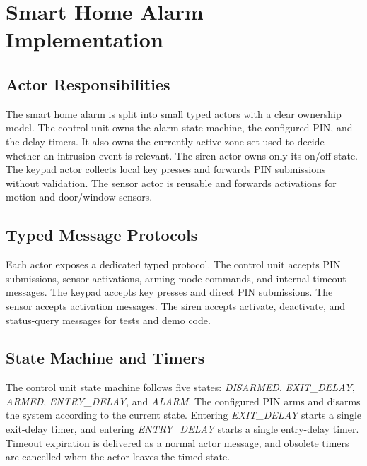 \section{Smart Home Alarm Implementation}

\subsection{Actor Responsibilities}
The smart home alarm is split into small typed actors with a clear ownership model.
The control unit owns the alarm state machine, the configured PIN, and the delay timers.
It also owns the currently active zone set used to decide whether an intrusion event is relevant.
The siren actor owns only its on/off state.
The keypad actor collects local key presses and forwards PIN submissions without validation.
The sensor actor is reusable and forwards activations for motion and door/window sensors.

\subsection{Typed Message Protocols}
Each actor exposes a dedicated typed protocol.
The control unit accepts PIN submissions, sensor activations, arming-mode commands, and internal timeout messages.
The keypad accepts key presses and direct PIN submissions.
The sensor accepts activation messages.
The siren accepts activate, deactivate, and status-query messages for tests and demo code.

\subsection{State Machine and Timers}
The control unit state machine follows five states: \textit{DISARMED}, \textit{EXIT\_DELAY}, \textit{ARMED}, \textit{ENTRY\_DELAY}, and \textit{ALARM}.
The configured PIN arms and disarms the system according to the current state.
Entering \textit{EXIT\_DELAY} starts a single exit-delay timer, and entering \textit{ENTRY\_DELAY} starts a single entry-delay timer.
Timeout expiration is delivered as a normal actor message, and obsolete timers are cancelled when the actor leaves the timed state.

